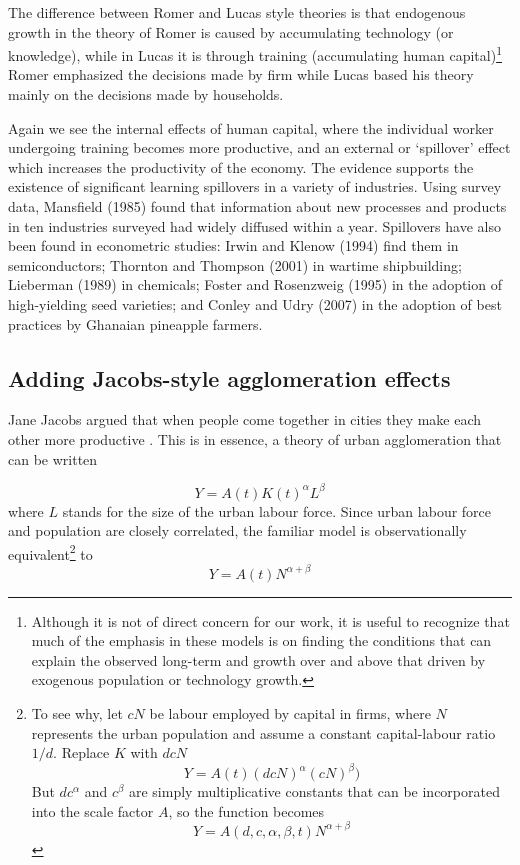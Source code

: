 The difference between Romer and Lucas style theories is that endogenous growth in the theory of Romer is caused by accumulating technology (or knowledge), while in Lucas it is through training (accumulating human capital)\footnote{Although it is not of direct concern for our work, it is useful to recognize that much of the emphasis in these models is on finding the conditions that can explain the observed long-term  and growth over and above that driven by exogenous population or technology growth. } Romer  emphasized the decisions made by firm while Lucas  based his theory mainly on the decisions made by households. 


Again we see the  internal effects of human capital, where the individual worker undergoing training becomes more productive, and an external or `spillover' effect which increases the productivity of the economy. 
The evidence supports the existence of significant learning spillovers in a variety of industries. Using survey data, Mansfield (1985) found that information about new processes and products in ten industries surveyed had widely diffused within a year. Spillovers have also been found in econometric studies: Irwin and Klenow (1994) find them in semiconductors; Thornton and Thompson (2001) in wartime shipbuilding; Lieberman (1989) in chemicals; Foster and Rosenzweig (1995) in the adoption of high-yielding seed varieties; and Conley and Udry (2007) in the adoption of best practices by Ghanaian pineapple farmers. 

\subsection{Adding Jacobs-style agglomeration effects}
Jane Jacobs argued that when people come together in cities they make each other more productive \cite{jacobsEconomyCities1969}. This is in essence, a theory of urban agglomeration that can be written

\begin{equation}
Y = A(t) K(t)^\alpha L^\beta 
\label{eqn-production-jacobs}
\end{equation}
where $L$ stands for the size of the urban labour force. Since urban labour force and population are closely correlated, the familiar model is observationally equivalent\footnote{ To see why, let  $cN$ be labour employed by capital in firms, where $N$ represents the urban population and assume a constant capital-labour ratio $1/d$. Replace $K$ with $dcN$
\[Y = A(t) (dcN)^\alpha (cN)^\beta) \]
But  $dc^\alpha$ and $c^\beta$ are simply multiplicative constants that can be incorporated into the scale factor $A$, so the function becomes 
\[Y = A(d, c,\alpha, \beta, t)N^{\alpha+\beta}\]
} to
\begin{equation}
Y = A(t)N^{\alpha+\beta}
\label{eqn-production-jacobs-2}
\end{equation}

